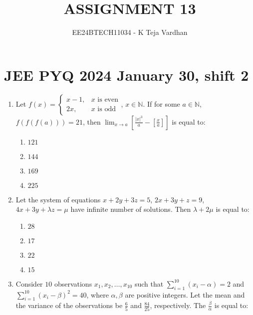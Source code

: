 \documentclass[journal]{IEEEtran}
\newcommand{\brak}[1]{\left( #1 \right)}
\newcommand{\sbrak}[1]{\left[ #1 \right]}
\newcommand{\abs}[1]{\left| #1 \right|}
\begin{document}

\title{ASSIGNMENT 13}
\author{EE24BTECH11034 - K Teja Vardhan}
{\let\newpage\relax\maketitle}

\section{JEE PYQ 2024 January 30, shift 2}
\begin{enumerate}

    \item Let $f\brak{x}=\begin{cases}
    x-1, & x\text{ is even} \\
    2x, & x\text{ is odd}
    \end{cases}$, $x\in\mathbb{N}$. If for some $a\in\mathbb{N}$, $f\brak{f\brak{f\brak{a}}}=21$, then $\lim_{x\to a}\sbrak{\frac{\abs{x}^{3}}{a}-\sbrak{\frac{x}{a}}}$ is equal to:
    
        \begin{multicols}{4}
        \begin{enumerate}
        \item $121$
        \item $144$
        \item $169$
        \item $225$
        \end{enumerate}
        \end{multicols}

    \item Let the system of equations $x+2y+3z=5$, $2x+3y+z=9$, $4x+3y+\lambda z=\mu$ have infinite number of solutions. Then $\lambda+2\mu$ is equal to:
        
        \begin{multicols}{4}
        \begin{enumerate}
        \item $28$
        \item $17$
        \item $22$
        \item $15$
        \end{enumerate}
        \end{multicols}
        
    \item Consider $10$ observations $x_1, x_2, \ldots, x_{10}$ such that $\sum_{i=1}^{10}\brak{x_i-\alpha}=2$ and $\sum_{i=1}^{10}\brak{x_i-\beta}^{2}=40$, where $\alpha, \beta$ are positive integers. Let the mean and the variance of the observations be $\frac{6}{5}$ and $\frac{84}{25}$, respectively. The $\frac{\beta}{\alpha}$ is equal to:
        

\end{enumerate}
\end{document}
